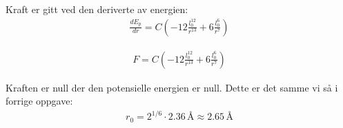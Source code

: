 \subsubsection{}

Kraft er gitt ved den deriverte av energien:
\begin{align}
\frac{dE_p}{dr} = C\left(-12\frac{l_0^{12}}{r^{13}} + 6\frac{l_0^6}{r^7}\right)
\end{align}

\begin{align}
F = C\left(-12\frac{l_0^{12}}{r^{13}} + 6\frac{l_0^6}{r^7}\right)
\end{align}

\begin{figure}[H]
\centering

\caption{}
\end{figure}

Kraften er null der den potensielle energien er null. Dette er det samme vi så i forrige oppgave:
\begin{align}
r_0 = 2^{1/6} \cdot 2.36\,\text{\AA} \approx 2.65\,\text{\AA}
\end{align}

\newpage




\newpage